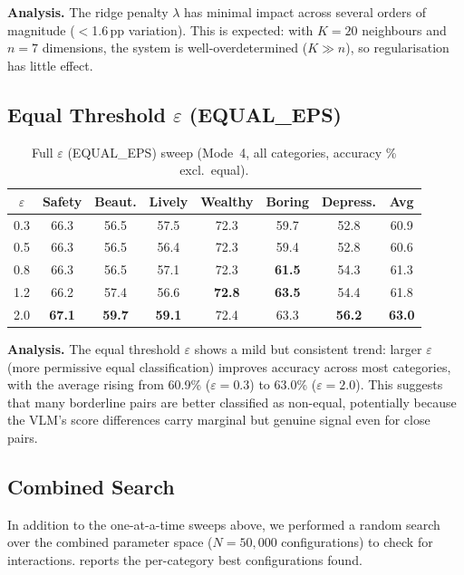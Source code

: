 \documentclass[runningheads]{llncs}
\begin{document}
\noindent\textbf{Analysis.}
The ridge penalty $\lambda$ has minimal impact across several orders of magnitude ($<$1.6\,pp variation).
This is expected: with $K{=}20$ neighbours and $n{=}7$ dimensions, the system is well-overdetermined ($K \gg n$), so regularisation has little effect.

\subsection{Equal Threshold $\varepsilon$ (EQUAL\_EPS)}

\begin{table}[ht]
\centering
\caption{Full $\varepsilon$ (EQUAL\_EPS) sweep (Mode~4, all categories, accuracy \% excl.\ equal).}
\label{tab:eps_sweep}
\small
\setlength{\tabcolsep}{4pt}
\begin{tabular}{ccccccc|c}
\toprule
$\varepsilon$ & Safety & Beaut. & Lively & Wealthy & Boring & Depress. & Avg \\
\midrule
0.3 & 66.3 & 56.5 & 57.5 & 72.3 & 59.7 & 52.8 & 60.9 \\
0.5 & 66.3 & 56.5 & 56.4 & 72.3 & 59.4 & 52.8 & 60.6 \\
0.8 & 66.3 & 56.5 & 57.1 & 72.3 & \textbf{61.5} & 54.3 & 61.3 \\
1.2 & 66.2 & 57.4 & 56.6 & \textbf{72.8} & \textbf{63.5} & 54.4 & 61.8 \\
2.0 & \textbf{67.1} & \textbf{59.7} & \textbf{59.1} & 72.4 & 63.3 & \textbf{56.2} & \textbf{63.0} \\
\bottomrule
\end{tabular}
\end{table}

\noindent\textbf{Analysis.}
The equal threshold $\varepsilon$ shows a mild but consistent trend: larger $\varepsilon$ (more permissive equal classification) improves accuracy across most categories, with the average rising from 60.9\% ($\varepsilon{=}0.3$) to 63.0\% ($\varepsilon{=}2.0$).
This suggests that many borderline pairs are better classified as non-equal, potentially because the VLM's score differences carry marginal but genuine signal even for close pairs.

\subsection{Combined Search}

In addition to the one-at-a-time sweeps above, we performed a random search over the combined parameter space ($N{=}50{,}000$ configurations) to check for interactions.
 reports the per-category best configurations found.
\end{document}

